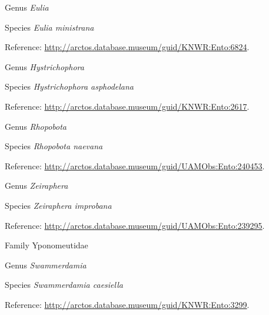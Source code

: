 \documentclass[9pt, article]{memoir}
\begin{document}
\begin{multicols}{2}
\vspace{6pt}\noindent\hspace{30pt}Genus \textit{Eulia}


\vspace{6pt}\noindent\hspace{36pt}Species \textit{Eulia ministrana}


Reference: 
\url{http://arctos.database.museum/guid/KNWR:Ento:6824}.

\vspace{6pt}\noindent\hspace{30pt}Genus \textit{Hystrichophora}


\vspace{6pt}\noindent\hspace{36pt}Species \textit{Hystrichophora asphodelana}


Reference: 
\url{http://arctos.database.museum/guid/KNWR:Ento:2617}.

\vspace{6pt}\noindent\hspace{30pt}Genus \textit{Rhopobota}


\vspace{6pt}\noindent\hspace{36pt}Species \textit{Rhopobota naevana}


Reference: 
\url{http://arctos.database.museum/guid/UAMObs:Ento:240453}.

\vspace{6pt}\noindent\hspace{30pt}Genus \textit{Zeiraphera}


\vspace{6pt}\noindent\hspace{36pt}Species \textit{Zeiraphera improbana}


Reference: 
\url{http://arctos.database.museum/guid/UAMObs:Ento:239295}.

\vspace{6pt}\noindent\hspace{24pt}Family Yponomeutidae


\vspace{6pt}\noindent\hspace{30pt}Genus \textit{Swammerdamia}


\vspace{6pt}\noindent\hspace{36pt}Species \textit{Swammerdamia caesiella}


Reference: 
\url{http://arctos.database.museum/guid/KNWR:Ento:3299}.


\end{multicols}
\end{document}
